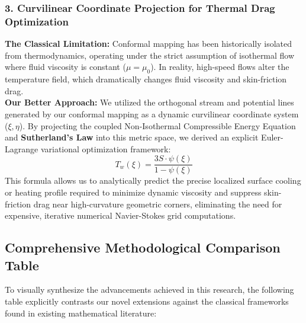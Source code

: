 \documentclass[12pt,a4paper]{article}
\begin{document}
\subsubsection{3. Curvilinear Coordinate Projection for Thermal Drag Optimization}
\textbf{The Classical Limitation:} Conformal mapping has been historically isolated from thermodynamics, operating under the strict assumption of isothermal flow where fluid viscosity is constant ($\mu = \mu_0$). In reality, high-speed flows alter the temperature field, which dramatically changes fluid viscosity and skin-friction drag. \\
\textbf{Our Better Approach:} We utilized the orthogonal stream and potential lines generated by our conformal mapping as a dynamic curvilinear coordinate system ($\xi, \eta$). By projecting the coupled Non-Isothermal Compressible Energy Equation and \textbf{Sutherland's Law} into this metric space, we derived an explicit Euler-Lagrange variational optimization framework:
\begin{equation}
    T_w(\xi) = \frac{3S \cdot \psi(\xi)}{1 - \psi(\xi)}
\end{equation}
This formula allows us to analytically predict the precise localized surface cooling or heating profile required to minimize dynamic viscosity and suppress skin-friction drag near high-curvature geometric corners, eliminating the need for expensive, iterative numerical Navier-Stokes grid computations.

\subsection{Comprehensive Methodological Comparison Table}
To visually synthesize the advancements achieved in this research, the following table explicitly contrasts our novel extensions against the classical frameworks found in existing mathematical literature:
\end{document}
